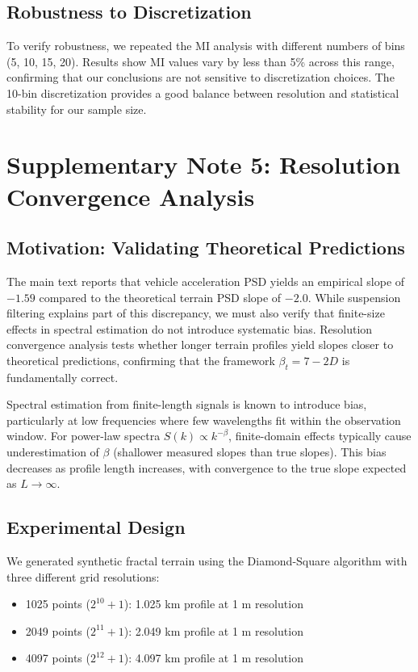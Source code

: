 \documentclass[11pt,letterpaper]{article}
\begin{document}
\subsection{Robustness to Discretization}

To verify robustness, we repeated the MI analysis with different numbers of bins (5, 10, 15, 20). Results show MI values vary by less than 5\% across this range, confirming that our conclusions are not sensitive to discretization choices. The 10-bin discretization provides a good balance between resolution and statistical stability for our sample size.


\section{Supplementary Note 5: Resolution Convergence Analysis}

\subsection{Motivation: Validating Theoretical Predictions}

The main text reports that vehicle acceleration PSD yields an empirical slope of $-1.59$ compared to the theoretical terrain PSD slope of $-2.0$. While suspension filtering explains part of this discrepancy, we must also verify that finite-size effects in spectral estimation do not introduce systematic bias. Resolution convergence analysis tests whether longer terrain profiles yield slopes closer to theoretical predictions, confirming that the framework $\beta_t = 7-2D$ is fundamentally correct.

Spectral estimation from finite-length signals is known to introduce bias, particularly at low frequencies where few wavelengths fit within the observation window\cite{Bendat2010}. For power-law spectra $S(k) \propto k^{-\beta}$, finite-domain effects typically cause underestimation of $\beta$ (shallower measured slopes than true slopes). This bias decreases as profile length increases, with convergence to the true slope expected as $L \to \infty$.

\subsection{Experimental Design}

We generated synthetic fractal terrain using the Diamond-Square algorithm with three different grid resolutions:
\begin{itemize}
\item 1025 points ($2^{10} + 1$): 1.025 km profile at 1 m resolution
\item 2049 points ($2^{11} + 1$): 2.049 km profile at 1 m resolution  
\item 4097 points ($2^{12} + 1$): 4.097 km profile at 1 m resolution
\end{itemize}
\end{document}
